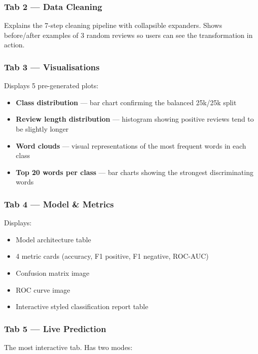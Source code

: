 \documentclass[12pt, a4paper]{article}
\begin{document}
\subsubsection{Tab 2 — Data Cleaning}

Explains the 7-step cleaning pipeline with collapsible expanders. Shows before/after examples of 3 random reviews so users can see the transformation in action.

\subsubsection{Tab 3 — Visualisations}

Displays 5 pre-generated plots:
\begin{itemize}
  \item \textbf{Class distribution} — bar chart confirming the balanced 25k/25k split
  \item \textbf{Review length distribution} — histogram showing positive reviews tend to be slightly longer
  \item \textbf{Word clouds} — visual representations of the most frequent words in each class
  \item \textbf{Top 20 words per class} — bar charts showing the strongest discriminating words
\end{itemize}

\subsubsection{Tab 4 — Model \& Metrics}

Displays:
\begin{itemize}
  \item Model architecture table
  \item 4 metric cards (accuracy, F1 positive, F1 negative, ROC-AUC)
  \item Confusion matrix image
  \item ROC curve image
  \item Interactive styled classification report table
\end{itemize}

\subsubsection{Tab 5 — Live Prediction}

The most interactive tab. Has two modes:
\end{document}
